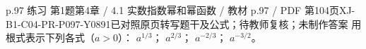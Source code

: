 \par\noindent\begin{minipage}{\linewidth}
\begin{bankitem}{p.97 练习 第1题}{第4章 / 4.1 实数指数幂和幂函数 / 教材 p.97 / PDF 第104页}{XJ-B1-C04-PR-P097-Y0891}{已对照原页转写题干及公式；待教师复核；未制作答案}
用根式表示下列各式（$a>0$）：
$a^{1/3}$；
$a^{2/3}$；
$a^{-2/3}$；
$a^{-3/2}$。
\end{bankitem}
\end{minipage}\par\medskip
